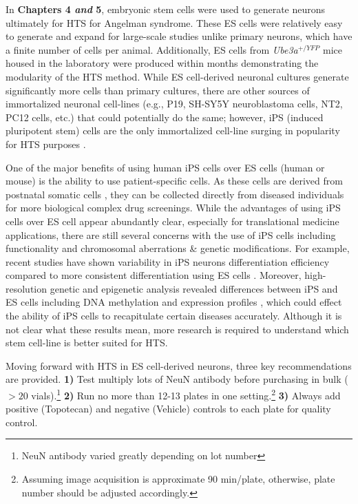 In \textbf{Chapters 4 \textit{and} 5}, embryonic stem cells were used to generate neurons ultimately for HTS for Angelman syndrome. These ES cells were relatively easy to generate and expand for large-scale studies unlike primary neurons, which have a finite number of cells per animal. Additionally, ES cells from \textit{Ube3a$^{+/YFP}$} mice housed in the laboratory were produced within months demonstrating the modularity of the HTS method. While ES cell-derived neuronal cultures generate significantly more cells than primary cultures, there are other sources of immortalized neuronal cell-lines (e.g., P19, SH-SY5Y neuroblastoma cells, NT2, PC12 cells, etc.) that could potentially do the same; however, iPS (induced pluripotent stem) cells are the only immortalized cell-line surging in popularity for HTS purposes \cite{Chambers2012,Crompton2013,Engle2014}.

One of the major benefits of using human iPS cells over ES cells (human or mouse) is the ability to use patient-specific cells. As these cells are derived from postnatal somatic cells \cite{Takahashi2007b,Yu2007}, they can be collected directly from diseased individuals for more biological complex drug screenings. While the advantages of using iPS cells over ES cell appear abundantly clear, especially for translational medicine applications, there are still several concerns with the use of iPS cells including functionality and chromosomal aberrations \& genetic modifications. For example, recent studies have shown variability in iPS neurons differentiation efficiency compared to more consistent differentiation using ES cells \cite{Hu2010}. Moreover, high-resolution genetic and epigenetic analysis revealed differences between iPS and ES cells including DNA methylation and expression profiles \cite{Chin2009,Deng2009}, which could effect the ability of iPS cells to recapitulate certain diseases accurately. Although it is not clear what these results mean, more research is required to understand which stem cell-line is better suited for HTS.

Moving forward with HTS in ES cell-derived neurons, three key recommendations are provided.
\textbf{1)} Test multiply lots of NeuN antibody before purchasing in bulk ($> 20$ vials).\footnote{NeuN antibody varied greatly depending on lot number}
\textbf{2)} Run no more than 12-13 plates in one setting.\footnote{Assuming image acquisition is approximate 90 min/plate, otherwise, plate number should be adjusted accordingly.}
\textbf{3)} Always add positive (Topotecan) and negative (Vehicle) controls to each plate for quality control.


